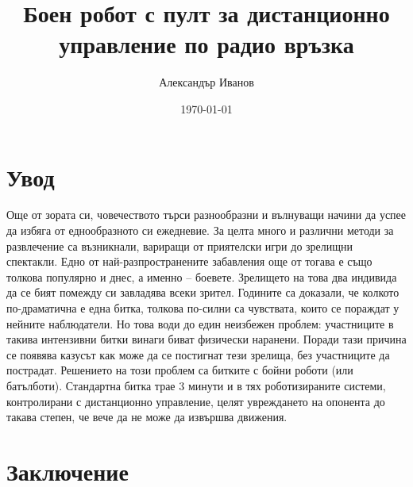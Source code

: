 \documentclass{tu_coursework}
\title{Боен робот с пулт за дистанционно управление по радио връзка}
\author{Александър Иванов}
\date{\today}
\begin{document}
\maketitle
\cleardoublepage





\chapter{Увод}
Още от зората си, човечеството търси разнообразни и вълнуващи начини да успее да избяга от еднообразното си ежедневие. За целта много и различни методи за развлечение са възникнали, вариращи от приятелски игри до зрелищни спектакли. Едно от най-разпространените забавления още от тогава е също толкова популярно и днес, а именно – боевете. Зрелището на това два индивида да се бият помежду си завладява всеки зрител. Годините са доказали, че колкото по-драматична е една битка, толкова по-силни са чувствата, които се пораждат у нейните наблюдатели. Но това води до един неизбежен проблем: участниците в такива интензивни битки винаги биват физически наранени. Поради тази причина се появява казусът как може да се постигнат тези зрелища, без участниците да пострадат. Решението на този проблем са битките с бойни роботи (или батълботи). Стандартна битка трае 3 минути и в тях роботизираните системи, контролирани с дистанционно управление, целят увреждането на опонента до такава степен, че вече да не може да извършва движения.












\chapter{Заключение}


\tableofcontents
\listoffigures
\listoftables
\printbibliography
\end{document}

